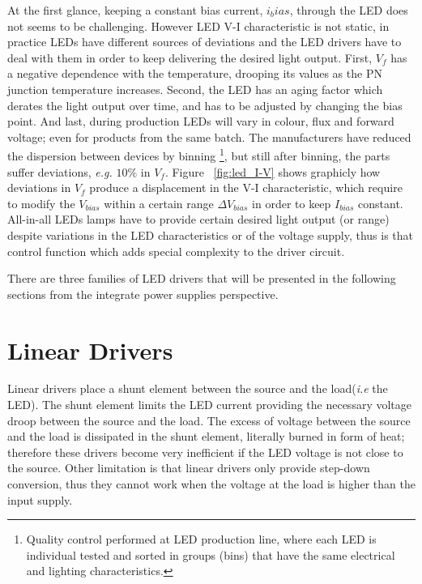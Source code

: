 At the first glance, keeping a constant bias current, $i_bias$, through the LED does not seems to be challenging. However LED V-I characteristic is not static, in practice LEDs have different sources of deviations and the LED drivers have to deal with them in order to keep delivering the desired light output. First, $V_f$ has a negative dependence with the temperature, drooping its values as the PN junction temperature increases. Second, the LED has an aging factor which derates the light output over time, and has to be adjusted by changing the bias point. And last, during production LEDs will vary in colour, flux and forward voltage; even for products from the same batch. The manufacturers have reduced the dispersion between devices by binning \footnote{Quality control performed at LED production line, where each LED is individual tested and sorted in groups (bins) that have the same electrical and lighting characteristics.}, but still after binning, the parts suffer deviations, \emph{e.g.} $10\%$ in $V_f$. Figure ~\ref{fig:led_I-V} shows graphicly how deviations in $V_f$ produce a displacement in the V-I characteristic,  which require to modify the $V_{bias}$ within a certain range $\Delta V_{bias}$ in order to keep $I_{bias}$ constant. All-in-all LEDs lamps have to
provide certain desired light output (or range) despite variations in the LED characteristics or of the voltage supply, thus is that control function which adds special complexity to the driver circuit.


There are three families of LED drivers that will be presented in the following sections from the integrate power supplies perspective.

\section{Linear Drivers}

Linear drivers place a shunt element between the source and the load(\emph{i.e} the LED). The shunt element limits the LED current providing the necessary voltage droop between the source and the load. The excess of voltage between the source and the load is dissipated in the shunt element, literally burned in form of heat; therefore these drivers become very inefficient if the LED voltage is not close to the source. Other limitation is that linear drivers only provide step-down conversion, thus they cannot work when the voltage at the load is higher than the input supply.


